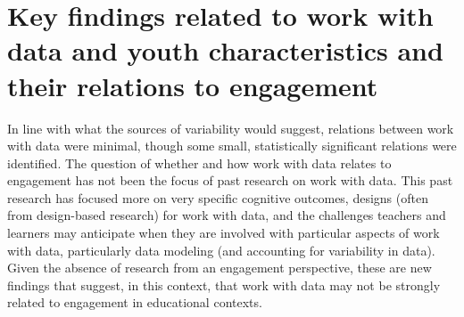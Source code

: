 \documentclass[]{msu-thesis}
\theoremstyle{definition}
\theoremstyle{definition}
\theoremstyle{definition}
\theoremstyle{remark}
\begin{document}
\section{Key findings related to work with data and youth
characteristics and their relations to
engagement}\label{key-findings-related-to-work-with-data-and-youth-characteristics-and-their-relations-to-engagement}

In line with what the sources of variability would suggest, relations
between work with data were minimal, though some small, statistically
significant relations were identified. The question of whether and how
work with data relates to engagement has not been the focus of past
research on work with data. This past research has focused more on very
specific cognitive outcomes, designs (often from design-based research)
for work with data, and the challenges teachers and learners may
anticipate when they are involved with particular aspects of work with
data, particularly data modeling (and accounting for variability in
data). Given the absence of research from an engagement perspective,
these are new findings that suggest, in this context, that work with
data may not be strongly related to engagement in educational contexts.
\end{document}
